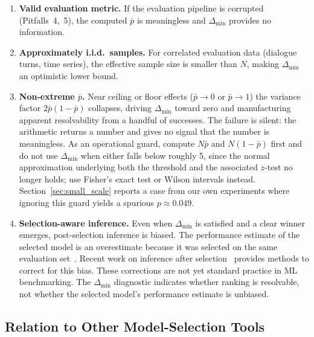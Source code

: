 \documentclass[pdflatex,sn-mathphys-ay,oneside]{sn-jnl}
\theoremstyle{thmstylethree}
\begin{document}
\begin{enumerate}
    \item \textbf{Valid evaluation metric.} If the evaluation pipeline is corrupted (Pitfalls~4,~5), the computed $\bar{p}$ is meaningless and $\Delta_{\min}$ provides no information.
    \item \textbf{Approximately i.i.d.\ samples.} For correlated evaluation data (dialogue turns, time series), the effective sample size is smaller than $N$, making $\Delta_{\min}$ an optimistic lower bound.
    \item \textbf{Non-extreme $\bar{p}$.} Near ceiling or floor effects ($\bar{p}\to0$ or $\bar{p}\to1$) the variance factor $2\bar{p}(1-\bar{p})$ collapses, driving $\Delta_{\min}$ toward zero and manufacturing apparent resolvability from a handful of successes. The failure is silent: the arithmetic returns a number and gives no signal that the number is meaningless. As an operational guard, compute $N\bar{p}$ and $N(1-\bar{p})$ first and do not use $\Delta_{\min}$ when either falls below roughly 5, since the normal approximation underlying both the threshold and the associated $z$-test no longer holds; use Fisher's exact test or Wilson intervals instead. Section~\ref{sec:small_scale} reports a case from our own experiments where ignoring this guard yields a spurious $p\approx0.049$.
    \item \textbf{Selection-aware inference.} Even when $\Delta_{\min}$ is satisfied and a clear winner emerges, post-selection inference is biased. The performance estimate of the selected model is an overestimate because it was selected on the same evaluation set~\citep{leeb2005model}. Recent work on inference after selection~\citep{zrnic2024flexible,zhang2024winners} provides methods to correct for this bias. These corrections are not yet standard practice in ML benchmarking. The $\Delta_{\min}$ diagnostic indicates whether ranking is resolvable, not whether the selected model's performance estimate is unbiased.
\end{enumerate}

\subsection{Relation to Other Model-Selection Tools}
\end{document}
